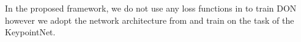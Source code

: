 In the proposed framework, we do not use any loss functions in
\parencites{florence2018dense}{florence2020dense}{kupcsik2021supervised}{adrian2022efficient}{hadjivelichkov2021fully}{nerf-Supervision} to train DON
however we adopt the network architecture from \cite{florence2018dense} and train on the task of the KeypointNet\parencites{suwajanakorn2018discovery}{zhao2020learning}.